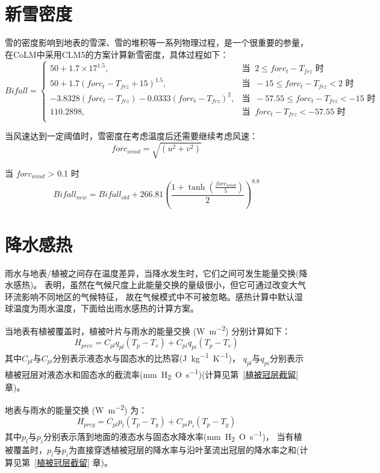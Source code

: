 \section{新雪密度}
雪的密度影响到地表的雪深、雪的堆积等一系列物理过程，是一个很重要的参量，在CoLM中采用CLM5的方案计算新雪密度，具体过程如下：
\begin{equation*}
Bifall= \begin{cases}
50 + 1.7\times 17^{1.5}, & \text{当 }\ 2\leqslant forc_t - T_{frz} \text{ 时}\\
50 + 1.7(forc_t - T_{frz}+15)^{1.5}, & \text{当 }\ -15\leqslant forc_t - T_{frz} < 2 \text{ 时} \\
-3.8328(forc_t - T_{frz}) - 0.0333(forc_t - T_{frz})^2, & \text{当 }\ -57.55\leqslant forc_t - T_{frz} < -15 \text{ 时} \\
110.2898, & \text{当 }\ forc_t - T_{frz} < -57.55 \text{ 时}\\
\end{cases}
\end{equation*}

当风速达到一定阈值时，雪密度在考虑温度后还需要继续考虑风速：
\begin{equation}
forc_{wind} = \sqrt{(u^2 + v^2)}
\end{equation}

当 $forc_{wind}$ > 0.1 时
\begin{equation}
Bifall_{new} = Bifall_{old} + 266.81{\left(\frac{1 + \tanh (\frac{forc_{wind}}{5})}{2}\right)}^{8.8}
\end{equation}


\section{降水感热}\label{植被地表的雨水感热}
雨水与地表/植被之间存在温度差异，当降水发生时，它们之间可发生能量交换(降水感热)。
\citet{wei2014impact} 表明，虽然在气候尺度上此能量交换的量级很小，但它可通过改变大气环流影响不同地区的气候特征，
故在气候模式中不可被忽略。感热计算中默认湿球温度为雨水温度，下面给出雨水感热的计算方案。

当地表有植被覆盖时，植被叶片与雨水的能量交换 (\unit{W.m^{-2}}) 分别计算如下：
\begin{equation}
H_{prcv}=C_{pl} q_{pl}\left(T_{p}-T_{v}\right)+C_{pi} q_{pi}\left(T_{p}-T_{v}\right)
\end{equation}
其中$C_{pl}$与$C_{pi}$分别表示液态水与固态水的比热容(\unit{J.kg^{-1}.K^{-1}})，
$q_{pl}$与$q_{pi}$分别表示植被冠层对液态水和固态水的截流率(\unit{mm.H_2O.s^{-1}})(计算见第~\ref{植被冠层截留} 章)。


地表与雨水的能量交换 (\unit{W.m^{-2}}) 为：
\begin{equation}
H_{p r c g}=C_{p l} p_{l}\left(T_{p}-T_{g}\right)+C_{p i} p_{i}\left(T_{p}-T_{g}\right)
\end{equation}
其中$p_l$与$p_i$分别表示落到地面的液态水与固态水降水率(\unit{mm.H_2O.s^{-1}})，
当有植被覆盖时，$p_l$与$p_i$为直接穿透植被冠层的降水率与沿叶茎流出冠层的降水率之和(计算见第~\ref{植被冠层截留} 章)。










